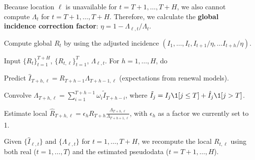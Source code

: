 \documentclass[12pt]{article}
\begin{document}
\bitem
\item Because location $\ell$ is unavailable for $t=T+1,\ldots,T+H$, we also
cannot compute $\Lambda_t$ for $t=T+1,\ldots,T+H$. Therefore, we calculate the
{\bf global incidence correction factor}: $\eta = 1 - \Lambda_{\ell,
t}/\Lambda_{t}$. 
\item Compute global $R_t$ by using the adjusted incidence $(I_1,\ldots,I_t, I_{t+1} / \eta, \ldots
I_{t+h} / \eta).$
\item Input $\{R_t\}_{t=1}^{T+H}$, $\{R_{t, \ell}\}_{t=1}^{T}$, $\Lambda_{\ell,t}$.
For $h = 1,\ldots,H$, do
\benum
\item Predict $\hat{I}_{T + h, \ell} = R_{T+h-1}\Lambda_{T+h-1, \ell}$ (expectations from renewal models).
\item Convolve $\Lambda_{T+h, \ell} = \sum_{i=1}^{T+h-1} \omega_{i}\tilde{I}_{T + h
- i}$, where $\tilde{I}_j = I_j \1[j\leq T] + \hat{I}_j \1[j>T]$.
\item Estimate local $\hat{R}_{T+h, \ell} = \epsilon_{h} R_{T+h} \frac{\Lambda_{T+h, \ell}}
{\Lambda_{T+h+1, \ell}}$, with $\epsilon_h$ as a factor we currently set to 1.
\eenum
\item Given $\{\hat{I}_{\ell, t}\}$ and $\{\Lambda_{\ell,t}\}$ for $t=1,\ldots,T+H$, we
recompute the local $R_{t,\ell}$ using both real ($t=1,\ldots,T$) and the
estimated pseudodata ($t=T+1,\ldots,H$).
\eitem
\end{document}
